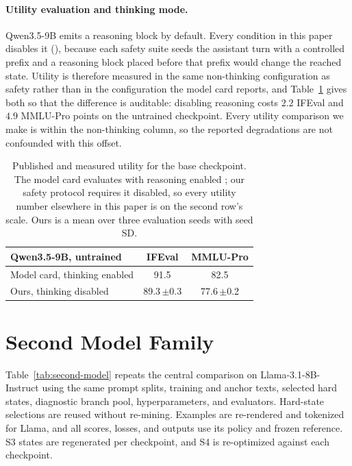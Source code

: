 \documentclass[11pt]{article}
\begin{document}
\paragraph{Utility evaluation and thinking mode.}
Qwen3.5-9B emits a reasoning block by default. Every condition in this paper
disables it (), because each safety suite seeds
the assistant turn with a controlled prefix and a reasoning block placed before
that prefix would change the reached state. Utility is therefore measured in the
same non-thinking configuration as safety rather than in the configuration the
model card reports, and Table~\ref{tab:thinking-gap} gives both so that the
difference is auditable: disabling reasoning costs \(2.2\) IFEval and \(4.9\)
MMLU-Pro points on the untrained checkpoint. Every utility comparison we make is
within the non-thinking column, so the reported degradations are not confounded
with this offset.

\begin{table}[t]
  \centering
  \footnotesize
  \begin{tabular}{lcc}
    \toprule
    Qwen3.5-9B, untrained & IFEval & MMLU-Pro \\
    \midrule
    Model card, thinking enabled
      & 91.5 & 82.5 \\
    Ours, thinking disabled
      & 89.3\,{\scriptsize$\pm$0.3} & 77.6\,{\scriptsize$\pm$0.2} \\
    \bottomrule
  \end{tabular}
  \caption{Published and measured utility for the base checkpoint. The model
  card evaluates with reasoning enabled \citep{qwen2026qwen35}; our safety
  protocol requires it disabled, so every utility number elsewhere in this paper
  is on the second row's scale. Ours is a mean over three evaluation seeds with
  seed SD.}
  \label{tab:thinking-gap}
\end{table}

\section{Second Model Family}
\label{app:second-model}

Table~\ref{tab:second-model} repeats the central comparison on
Llama-3.1-8B-Instruct using the same prompt splits, training and anchor texts,
selected hard states, diagnostic branch pool, hyperparameters, and evaluators.
Hard-state selections are reused without re-mining. Examples are re-rendered and
tokenized for Llama, and all scores, losses, and outputs use its policy and
frozen reference. S3 states are regenerated per checkpoint, and S4 is
re-optimized against each checkpoint.
\end{document}
